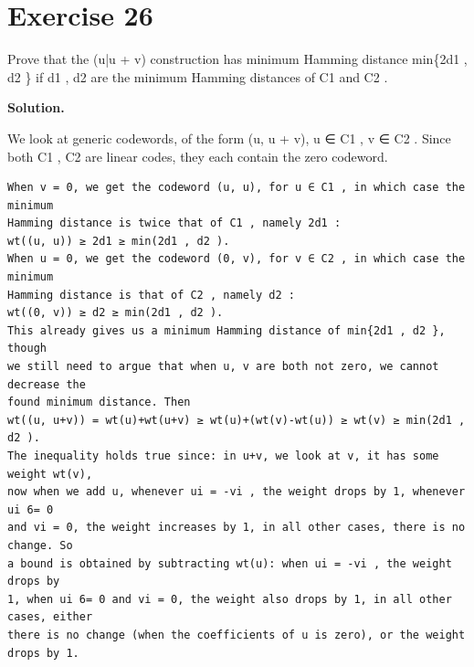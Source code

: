 \documentclass[11pt]{article}
\begin{document}
\section*{Exercise 26}
\begin{exercisebox}
Prove that the (u|u + v) construction has minimum Hamming distance min\{2d1 , d2 \} if d1 , d2 are the minimum Hamming distances of C1 and C2 .

\end{exercisebox}
\begin{solutionbox}
\textbf{Solution.}

We look at generic codewords, of the form (u, u + v), u ∈ C1 , v ∈ C2 . Since both C1 , C2 are linear codes, they each contain the zero codeword.

\begin{Verbatim}[fontsize=\small]
When v = 0, we get the codeword (u, u), for u ∈ C1 , in which case the minimum
Hamming distance is twice that of C1 , namely 2d1 :
wt((u, u)) ≥ 2d1 ≥ min(2d1 , d2 ).
When u = 0, we get the codeword (0, v), for v ∈ C2 , in which case the minimum
Hamming distance is that of C2 , namely d2 :
wt((0, v)) ≥ d2 ≥ min(2d1 , d2 ).
This already gives us a minimum Hamming distance of min{2d1 , d2 }, though
we still need to argue that when u, v are both not zero, we cannot decrease the
found minimum distance. Then
wt((u, u+v)) = wt(u)+wt(u+v) ≥ wt(u)+(wt(v)-wt(u)) ≥ wt(v) ≥ min(2d1 , d2 ).
The inequality holds true since: in u+v, we look at v, it has some weight wt(v),
now when we add u, whenever ui = -vi , the weight drops by 1, whenever ui 6= 0
and vi = 0, the weight increases by 1, in all other cases, there is no change. So
a bound is obtained by subtracting wt(u): when ui = -vi , the weight drops by
1, when ui 6= 0 and vi = 0, the weight also drops by 1, in all other cases, either
there is no change (when the coefficients of u is zero), or the weight drops by 1.
\end{Verbatim}
\end{solutionbox}
\end{document}
